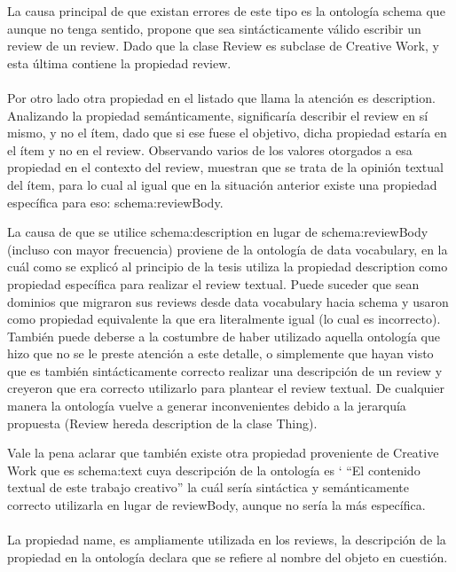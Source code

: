  La causa principal de que existan errores de este tipo es la ontología schema que aunque no tenga sentido, propone que sea sintácticamente válido
 escribir un review de un review. Dado que la clase Review es subclase de Creative Work, y esta última contiene la propiedad review.
 \\\\
 Por otro lado otra propiedad en el listado que llama la atención es description. Analizando la propiedad semánticamente, significaría describir 
 el review en sí mismo, y no el ítem, dado que si ese fuese el objetivo, dicha propiedad estaría en el ítem y no en el review.
 Observando varios de los valores otorgados a esa propiedad en el contexto del review, muestran que se trata de la opinión textual del ítem, 
 para lo cual al igual que en la situación anterior existe una propiedad específica para eso: schema:reviewBody. 
 
 La causa de que se utilice schema:description en lugar de schema:reviewBody (incluso con mayor frecuencia) proviene de la ontología de data vocabulary, en la cuál 
 como se explicó al principio de la tesis utiliza la propiedad description como propiedad específica para realizar el review textual.
 Puede suceder que sean dominios que migraron sus reviews desde data vocabulary hacia schema y usaron como propiedad equivalente la que 
 era literalmente igual (lo cual es incorrecto). También puede deberse a la costumbre de haber utilizado aquella ontología que hizo que no se le 
 preste atención a este detalle, o simplemente que hayan visto que es también sintácticamente correcto realizar una descripción de un review 
 y creyeron que era correcto utilizarlo para plantear el review textual.
 De cualquier manera la ontología vuelve a generar inconvenientes debido a la jerarquía propuesta (Review hereda description de la clase Thing).
 
 Vale la pena aclarar que también existe otra propiedad proveniente de Creative Work que es schema:text cuya descripción de la ontología es `
 ``El contenido textual de este trabajo creativo'' la cuál sería sintáctica y semánticamente correcto utilizarla en lugar de reviewBody, aunque 
 no sería la más específica.
 \\\\
 La propiedad name, es ampliamente utilizada en los reviews, la descripción de la propiedad en la ontología declara que se refiere al nombre del objeto en cuestión. 
 
